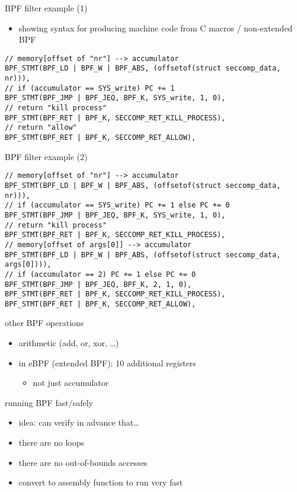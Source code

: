 \begin{frame}[fragile]{BPF filter example (1)}
\begin{itemize}
\item showing syntax for producing machine code from C macros / non-extended BPF
\end{itemize}
\begin{Verbatim}[fontsize=\fontsize{10}{11}]
// memory[offset of "nr"] --> accumulator
BPF_STMT(BPF_LD | BPF_W | BPF_ABS, (offsetof(struct seccomp_data, nr))),
// if (accumulator == SYS_write) PC += 1
BPF_STMT(BPF_JMP | BPF_JEQ, BPF_K, SYS_write, 1, 0),
// return "kill process"
BPF_STMT(BPF_RET | BPF_K, SECCOMP_RET_KILL_PROCESS),
// return "allow"
BPF_STMT(BPF_RET | BPF_K, SECCOMP_RET_ALLOW),
\end{Verbatim}
\end{frame}

\begin{frame}[fragile]{BPF filter example (2)}
\begin{Verbatim}[fontsize=\fontsize{10}{11}]
// memory[offset of "nr"] --> accumulator
BPF_STMT(BPF_LD | BPF_W | BPF_ABS, (offsetof(struct seccomp_data, nr))),
// if (accumulator == SYS_write) PC += 1 else PC += 0
BPF_STMT(BPF_JMP | BPF_JEQ, BPF_K, SYS_write, 1, 0),
// return "kill process"
BPF_STMT(BPF_RET | BPF_K, SECCOMP_RET_KILL_PROCESS),
// memory[offset of args[0]] --> accumulator
BPF_STMT(BPF_LD | BPF_W | BPF_ABS, (offsetof(struct seccomp_data, args[0]))),
// if (accumulator == 2) PC += 1 else PC += 0
BPF_STMT(BPF_JMP | BPF_JEQ, BPF_K, 2, 1, 0),
BPF_STMT(BPF_RET | BPF_K, SECCOMP_RET_KILL_PROCESS),
BPF_STMT(BPF_RET | BPF_K, SECCOMP_RET_ALLOW),
\end{Verbatim}
\end{frame}

\begin{frame}{other BPF operations}
    \begin{itemize}
    \item arithmetic (add, or, xor, \ldots)
    \item in eBPF (extended BPF): 10 additional registers
        \begin{itemize}
        \item not just accumulator
        \end{itemize}
    \end{itemize}
\end{frame}

\begin{frame}{running BPF fast/safely}
    \begin{itemize}
    \item idea: can verify in advance that\ldots
    \item there are no loops
    \item there are no out-of-bounds accesses
    \vspace{.5cm}
    \item convert to assembly function to run very fast
    \end{itemize}
\end{frame}

